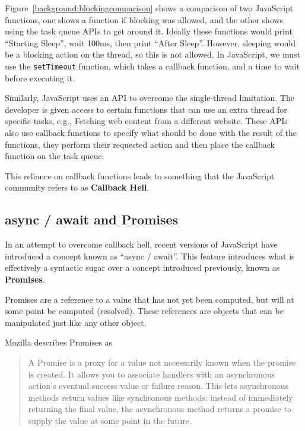 Figure~\ref{background:blockingcomparison} shows a comparison of two JavaScript functions, one shows a function if blocking was allowed, and the other shows using the task queue APIs to get around it. Ideally these functions would print ``Starting Sleep'', wait 100ms, then print ``After Sleep''. However, sleeping would be a blocking action on the thread, so this is not allowed. In JavaScript, we must use the \texttt{setTimeout} function, which takes a callback function, and a time to wait before executing it.

Similarly, JavaScript uses an API to overcome the single-thread limitation. The developer is given access to certain functions that can use an extra thread for specific tasks, e.g., Fetching web content from a different website. These APIs also use callback functions to specify what should be done with the result of the functions, they perform their requested action and then place the callback function on the task queue.

This reliance on callback functions leads to something that the JavaScript community refers to as \textbf{Callback Hell}\cite{callbackhell}.

\subsection{async / await and Promises}\label{background:asyncawait}

In an attempt to overcome callback hell, recent versions of JavaScript have introduced a concept known as ``async / await''.\cite{es8spec} This feature introduces what is effectively a syntactic sugar over a concept introduced previously, known as \textbf{Promises}.

Promises are a reference to a value that has not yet been computed, but will at some point be computed (resolved). These references are objects that can be manipulated just like any other object.

Mozilla describes Promises as
\begin{quote}
A Promise is a proxy for a value not necessarily known when the promise is created. It allows you to associate handlers with an asynchronous action's eventual success value or failure reason. This lets asynchronous methods return values like synchronous methods: instead of immediately returning the final value, the asynchronous method returns a promise to supply the value at some point in the future.
    \cite{mozillapromises}
\end{quote}

